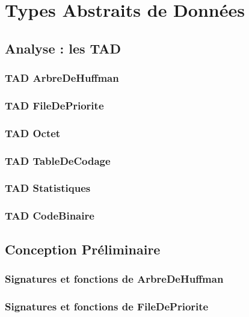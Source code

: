\documentclass[10pt]{report}
\begin{document}
    \chapter{Types Abstraits de Données}
        \section{Analyse : les TAD}
            \subsection{TAD ArbreDeHuffman}
            
            \subsection{TAD FileDePriorite}
            
            \subsection{TAD Octet}
            
            \subsection{TAD TableDeCodage}
            
            \subsection{TAD Statistiques}
            
            \subsection{TAD CodeBinaire}
            
        \section{Conception Préliminaire}
            \subsection{Signatures et fonctions de ArbreDeHuffman}
            
            \subsection{Signatures et fonctions de FileDePriorite}
            
\end{document}

